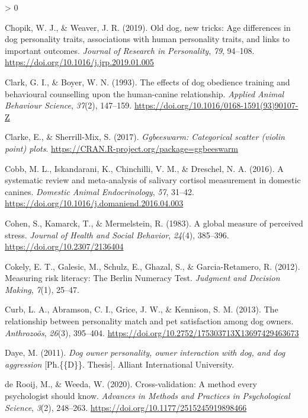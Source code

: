 \documentclass[
  english,
  ,pub,floatsintext]{apa6}
\newlength{\cslhangindent}
\newenvironment{CSLReferences}[2] %
 {%
  \setlength{\parindent}{0pt}
  \ifodd #1 \everypar{\setlength{\hangindent}{\cslhangindent}}\ignorespaces\fi
  \ifnum #2 > 0
  \setlength{\parskip}{#2\baselineskip}
  \fi
 }%
 {}
\begin{document}
\begin{CSLReferences}{1}{0}
\leavevmode\hypertarget{ref-Chopik.Weaver.2019}{}%
Chopik, W. J., \& Weaver, J. R. (2019). Old dog, new tricks: {Age} differences in dog personality traits, associations with human personality traits, and links to important outcomes. \emph{Journal of Research in Personality}, \emph{79}, 94--108. \url{https://doi.org/10.1016/j.jrp.2019.01.005}

\leavevmode\hypertarget{ref-Clark.Boyer.1993}{}%
Clark, G. I., \& Boyer, W. N. (1993). The effects of dog obedience training and behavioural counselling upon the human-canine relationship. \emph{Applied Animal Behaviour Science}, \emph{37}(2), 147--159. \url{https://doi.org/10.1016/0168-1591(93)90107-Z}

\leavevmode\hypertarget{ref-R-ggbeeswarm}{}%
Clarke, E., \& Sherrill-Mix, S. (2017). \emph{Ggbeeswarm: Categorical scatter (violin point) plots}. \url{https://CRAN.R-project.org/package=ggbeeswarm}

\leavevmode\hypertarget{ref-Cobb.etal.2016}{}%
Cobb, M. L., Iskandarani, K., Chinchilli, V. M., \& Dreschel, N. A. (2016). A systematic review and meta-analysis of salivary cortisol measurement in domestic canines. \emph{Domestic Animal Endocrinology}, \emph{57}, 31--42. \url{https://doi.org/10.1016/j.domaniend.2016.04.003}

\leavevmode\hypertarget{ref-Cohen.etal.1983}{}%
Cohen, S., Kamarck, T., \& Mermelstein, R. (1983). A global measure of perceived stress. \emph{Journal of Health and Social Behavior}, \emph{24}(4), 385--396. \url{https://doi.org/10.2307/2136404}

\leavevmode\hypertarget{ref-Cokely.etal.2012}{}%
Cokely, E. T., Galesic, M., Schulz, E., Ghazal, S., \& Garcia-Retamero, R. (2012). Measuring risk literacy: {The Berlin Numeracy Test}. \emph{Judgment and Decision Making}, \emph{7}(1), 25--47.

\leavevmode\hypertarget{ref-Curb.etal.2013}{}%
Curb, L. A., Abramson, C. I., Grice, J. W., \& Kennison, S. M. (2013). The relationship between personality match and pet satisfaction among dog owners. \emph{Anthrozoös}, \emph{26}(3), 395--404. \url{https://doi.org/10.2752/175303713X13697429463673}

\leavevmode\hypertarget{ref-Daye.2011}{}%
Daye, M. (2011). \emph{Dog owner personality, owner interaction with dog, and dog aggression} {[}Ph.\{\{D\}\}. Thesis{]}. Alliant International University.

\leavevmode\hypertarget{ref-deRooij.Weeda.2020}{}%
de Rooij, M., \& Weeda, W. (2020). Cross-validation: {A} method every psychologist should know. \emph{Advances in Methods and Practices in Psychological Science}, \emph{3}(2), 248--263. \url{https://doi.org/10.1177/2515245919898466}


\end{CSLReferences}
\end{document}
